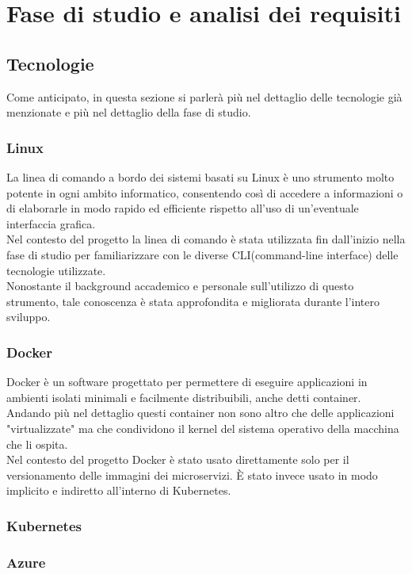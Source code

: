 \documentclass[a4paper,12pt]{report}
\begin{document}

\chapter{Fase di studio e analisi dei requisiti}
\section{Tecnologie}
Come anticipato, in questa sezione si parlerà più nel dettaglio delle tecnologie già menzionate e più nel dettaglio della fase di studio.
\subsection{Linux}
La linea di comando a bordo dei sistemi basati su Linux è uno strumento molto potente in ogni ambito informatico, consentendo così di accedere a informazioni o di elaborarle in modo rapido ed efficiente rispetto all'uso di un'eventuale interfaccia grafica.\\
Nel contesto del progetto la linea di comando è stata utilizzata fin dall'inizio nella fase di studio per familiarizzare con le diverse CLI(command-line interface) delle tecnologie utilizzate. \\
Nonostante il background accademico e personale sull'utilizzo di questo strumento, tale conoscenza è stata approfondita e migliorata durante l'intero sviluppo.\\
\subsection{Docker}
Docker è un software progettato per permettere di eseguire applicazioni in ambienti isolati minimali e facilmente distribuibili, anche detti container. \cite{docker} \\
Andando più nel dettaglio questi container non sono altro che delle applicazioni "virtualizzate" ma che condividono il kernel del sistema operativo della macchina che li ospita. \\
Nel contesto del progetto Docker è stato usato direttamente solo per il versionamento delle immagini dei microservizi. È stato invece usato in modo implicito e indiretto all'interno di Kubernetes.
\subsection{Kubernetes}
\subsection{Azure}
\end{document}

